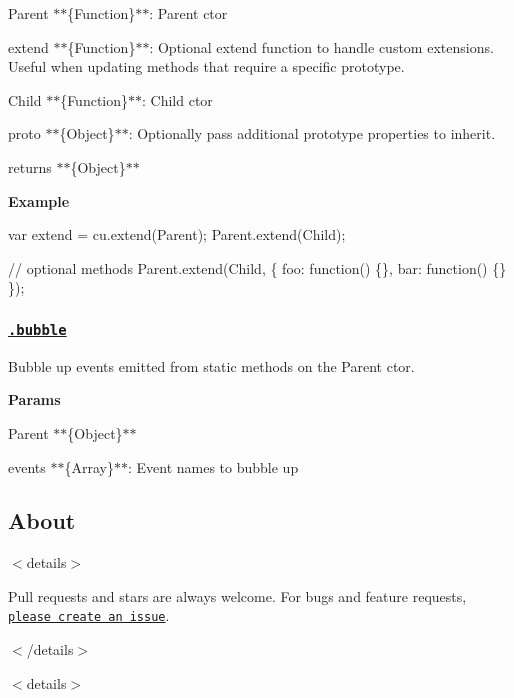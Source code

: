 \begin{DoxyItemize}
\item {\ttfamily Parent} $\ast$$\ast$\{Function\}$\ast$$\ast$\+: Parent ctor
\item {\ttfamily extend} $\ast$$\ast$\{Function\}$\ast$$\ast$\+: Optional extend function to handle custom extensions. Useful when updating methods that require a specific prototype.
\item {\ttfamily Child} $\ast$$\ast$\{Function\}$\ast$$\ast$\+: Child ctor
\item {\ttfamily proto} $\ast$$\ast$\{Object\}$\ast$$\ast$\+: Optionally pass additional prototype properties to inherit.
\item {\ttfamily returns} $\ast$$\ast$\{Object\}$\ast$$\ast$
\end{DoxyItemize}

{\bfseries Example}


\begin{DoxyCode}
var extend = cu.extend(Parent);
Parent.extend(Child);

// optional methods
Parent.extend(Child, \{
  foo: function() \{\},
  bar: function() \{\}
\});
\end{DoxyCode}


\subsubsection*{\href{index.js#L356}{\tt .bubble}}

Bubble up events emitted from static methods on the Parent ctor.

{\bfseries Params}


\begin{DoxyItemize}
\item {\ttfamily Parent} $\ast$$\ast$\{Object\}$\ast$$\ast$
\item {\ttfamily events} $\ast$$\ast$\{Array\}$\ast$$\ast$\+: Event names to bubble up
\end{DoxyItemize}

\subsection*{About}

$<$details$>$

Pull requests and stars are always welcome. For bugs and feature requests, \href{../../issues/new}{\tt please create an issue}.

$<$/details$>$

$<$details$>$ 

